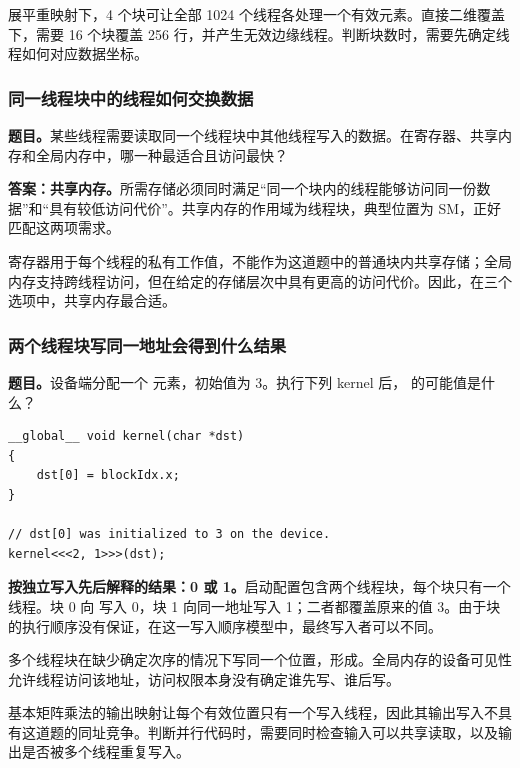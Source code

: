 \begin{keybox}[title={块数随索引方案变化}]
展平重映射下，4 个块可让全部 1024 个线程各处理一个有效元素。直接二维覆盖下，需要 16 个块覆盖 256 行，并产生无效边缘线程。判断块数时，需要先确定线程如何对应数据坐标。
\end{keybox}

\subsubsection{同一线程块中的线程如何交换数据}

\textbf{题目。}某些线程需要读取同一个线程块中其他线程写入的数据。在寄存器、共享内存和全局内存中，哪一种最适合且访问最快？

\textbf{答案：共享内存。}所需存储必须同时满足“同一个块内的线程能够访问同一份数据”和“具有较低访问代价”。共享内存的作用域为线程块，典型位置为 SM，正好匹配这两项需求。

寄存器用于每个线程的私有工作值，不能作为这道题中的普通块内共享存储；全局内存支持跨线程访问，但在给定的存储层次中具有更高的访问代价。因此，在三个选项中，共享内存最合适。

\Needspace{0.4\textheight}
\subsubsection{两个线程块写同一地址会得到什么结果}

\par\noindent\begin{minipage}{\linewidth}
\textbf{题目。}设备端分配一个  元素，初始值为 3。执行下列 kernel 后， 的可能值是什么？
\begin{lstlisting}[caption={两个线程块各用一个线程写入同一全局地址。}]
__global__ void kernel(char *dst)
{
    dst[0] = blockIdx.x;
}

// dst[0] was initialized to 3 on the device.
kernel<<<2, 1>>>(dst);
\end{lstlisting}
\end{minipage}\par
\textbf{按独立写入先后解释的结果：0 或 1。}启动配置包含两个线程块，每个块只有一个线程。块 0 向  写入 0，块 1 向同一地址写入 1；二者都覆盖原来的值 3。由于块的执行顺序没有保证，在这一写入顺序模型中，最终写入者可以不同。

多个线程块在缺少确定次序的情况下写同一个位置，形成。全局内存的设备可见性允许线程访问该地址，访问权限本身没有确定谁先写、谁后写。

基本矩阵乘法的输出映射让每个有效位置只有一个写入线程，因此其输出写入不具有这道题的同址竞争。判断并行代码时，需要同时检查输入可以共享读取，以及输出是否被多个线程重复写入。

